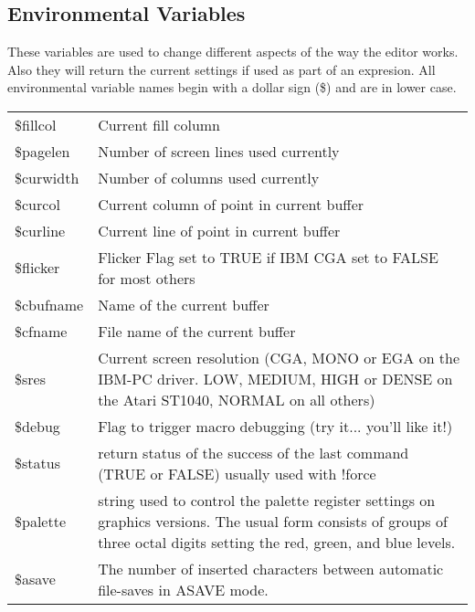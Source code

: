 \subsection{Environmental Variables}

These variables are used to change different aspects of the way
the editor works.  Also they will return the current settings if used as
part of an expresion.  All environmental variable names begin with a
dollar sign (\$) and are in lower case.

\begin{tabular}{lp{5in}}
\$fillcol & Current fill column \\

\$pagelen & Number of screen lines used currently \\

\$curwidth & Number of columns used currently \\

\$curcol & Current column of point in current buffer \\

\$curline & Current line of point in current buffer \\

\$flicker & Flicker Flag set to TRUE if IBM CGA set to FALSE for most
others \\

\$cbufname & Name of the current buffer \\

\$cfname & File name of the current buffer \\

\$sres & Current screen resolution (CGA, MONO or EGA on the IBM-PC driver.
LOW, MEDIUM, HIGH or DENSE on the Atari ST1040,
NORMAL on all others) \\

\$debug & Flag to trigger macro debugging (try it... you'll like it!) \\

\$status & return status of the success of the last command
(TRUE or FALSE) usually used with !force \\

\$palette & string used to control the palette register
settings on graphics versions.  The usual form
consists of groups of three octal digits
setting the red, green, and blue levels. \\

\$asave & The number of inserted characters between
automatic file-saves in ASAVE mode. \\


\end{tabular}
